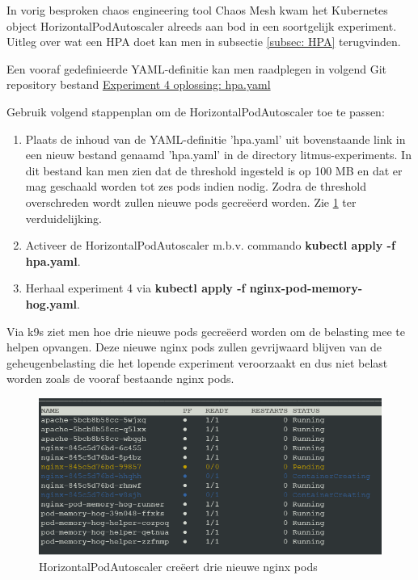 In vorig besproken chaos engineering tool Chaos Mesh kwam het Kubernetes object HorizontalPodAutoscaler alreeds aan bod in een soortgelijk experiment. Uitleg over wat een HPA doet kan men in subsectie \ref{subsec: HPA} terugvinden.   

Een vooraf gedefinieerde YAML-definitie kan men raadplegen in volgend Git repository bestand  \href{https://github.com/KenBruggeman/BP\textunderscore 21-22/blob/master/bachelorproef/docs/litmus%20experimenten/hpa.yaml}{Experiment 4 oplossing: hpa.yaml}

Gebruik volgend stappenplan om de HorizontalPodAutoscaler toe te passen:
\begin{enumerate}
    \item Plaats de inhoud van de YAML-definitie 'hpa.yaml' uit bovenstaande link in een nieuw bestand genaamd 'hpa.yaml' in de directory litmus-experiments. In dit bestand kan men zien dat de threshold ingesteld is op 100 MB en dat er mag geschaald worden tot zes pods indien nodig. Zodra de threshold overschreden wordt zullen nieuwe pods gecreëerd worden. Zie \ref{img:threshold} ter verduidelijking.
    \item Activeer de HorizontalPodAutoscaler m.b.v. commando {\bf kubectl apply -f hpa.yaml}.
    \item Herhaal experiment 4 via {\bf kubectl apply -f nginx-pod-memory-hog.yaml}.
\end{enumerate}    
  
Via k9s ziet men hoe drie nieuwe pods gecreëerd worden om de belasting mee te helpen opvangen.
Deze nieuwe nginx pods zullen gevrijwaard blijven van de geheugenbelasting die het lopende experiment veroorzaakt en dus niet belast worden zoals de vooraf bestaande nginx pods.  

\begin{figure}[h]
    \centering
    \includegraphics[scale=.9]{img/hpa_effect.png}
    \caption{HorizontalPodAutoscaler creëert drie nieuwe nginx pods}
    \label{img:threshold}
\end{figure}

